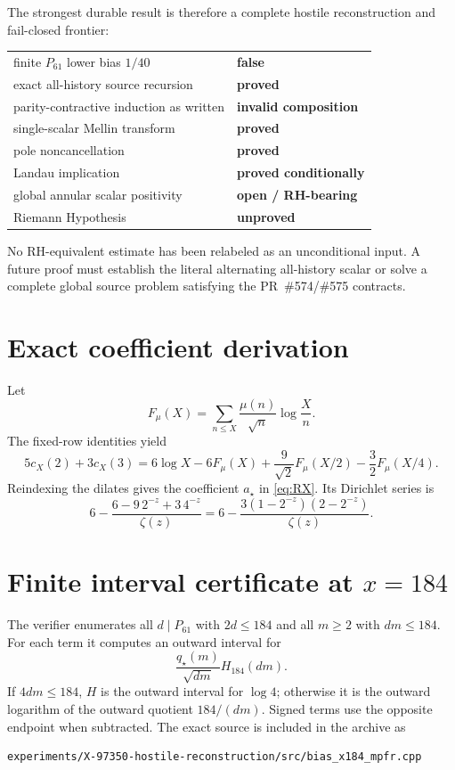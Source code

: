 \documentclass[11pt]{article}
\newcommand{\Psmall}{P_{61}}
\begin{document}
The strongest durable result is therefore a complete hostile reconstruction and fail-closed frontier:
\begin{center}
\begin{tabular}{ll}
finite $P_{61}$ lower bias $1/40$ & \textbf{false} \\
exact all-history source recursion & \textbf{proved} \\
parity-contractive induction as written & \textbf{invalid composition} \\
single-scalar Mellin transform & \textbf{proved} \\
pole noncancellation & \textbf{proved} \\
Landau implication & \textbf{proved conditionally} \\
global annular scalar positivity & \textbf{open / RH-bearing} \\
Riemann Hypothesis & \textbf{unproved} \\
\end{tabular}
\end{center}
No RH-equivalent estimate has been relabeled as an unconditional input.  A future proof must establish the literal alternating all-history scalar or solve a complete global source problem satisfying the PR~\#574/\#575 contracts.

\appendix
\section{Exact coefficient derivation}
Let
\[
 F_\mu(X)=\sum_{n\le X}\frac{\mu(n)}{\sqrt n}\log\frac Xn.
\]
The fixed-row identities yield
\[
5c_X(2)+3c_X(3)
=6\log X-6F_\mu(X)+\frac9{\sqrt2}F_\mu(X/2)-\frac32F_\mu(X/4).
\]
Reindexing the dilates gives the coefficient $a_\star$ in \eqref{eq:RX}.  Its Dirichlet series is
\[
6-\frac{6-9\,2^{-z}+3\,4^{-z}}{\zeta(z)}
=6-\frac{3(1-2^{-z})(2-2^{-z})}{\zeta(z)}.
\]

\section{Finite interval certificate at $x=184$}
The verifier enumerates all $d\mid\Psmall$ with $2d\le184$ and all $m\ge2$ with $dm\le184$.  For each term it computes an outward interval for
\[
 \frac{q_\star(m)}{\sqrt{dm}}H_{184}(dm).
\]
If $4dm\le184$, $H$ is the outward interval for $\log4$; otherwise it is the outward logarithm of the outward quotient $184/(dm)$.  Signed terms use the opposite endpoint when subtracted.  The exact source is included in the archive as
\begin{lstlisting}[basicstyle=\ttfamily\footnotesize]
experiments/X-97350-hostile-reconstruction/src/bias_x184_mpfr.cpp
\end{lstlisting}
\end{document}
